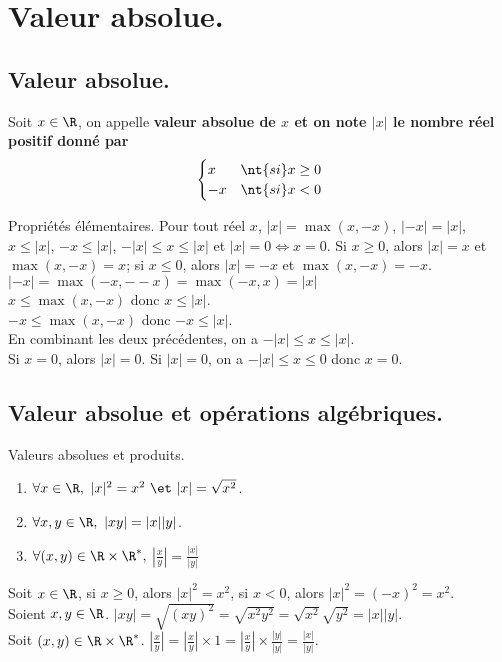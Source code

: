 \documentclass[11pt]{article}
\begin{document}
\section{Valeur absolue.}

\subsection{Valeur absolue.}

\begin{defi}{}{}
    Soit $x\in\R$, on appelle \bf{valeur absolue} de $x$ et on note $|x|$ le nombre réel positif donné par
    \begin{equation*}
        \begin{cases}
            x&\nt{si }x\geq0\\
            -x&\nt{si }x<0
        \end{cases}
    \end{equation*}
\end{defi}

\begin{prop}{Propriétés élémentaires.}{}
    Pour tout réel $x$, $|x|=\max(x,-x)$, $|-x|=|x|$, $x\leq|x|$, $-x\leq|x|$, $-|x|\leq x\leq |x|$ et $|x|=0\iff x=0$.
    \tcblower
     Si $x\geq0$, alors $|x|=x$ et $\max(x,-x)=x$; si $x\leq0$, alors $|x|=-x$ et $\max(x,-x)=-x$.\\
     $|-x|=\max(-x,--x)=\max(-x,x)=|x|$ \\
     $x\leq\max(x,-x)$ donc $x\leq |x|$.\\
     $-x\leq\max(x,-x)$ donc $-x\leq|x|$.\\
     En combinant les deux précédentes, on a $-|x|\leq x\leq |x|$.\\
     Si $x=0$, alors $|x|=0$. Si $|x|=0$, on a $-|x|\leq x\leq 0$ donc $x=0$.
\end{prop}

\subsection{Valeur absolue et opérations algébriques.}

\begin{prop}{Valeurs absolues et produits.}{}
    \begin{enumerate}
        \item $\forall x\in\R,~|x|^2=x^2~\et~|x|=\sqrt{x^2}$.
        \item $\forall x,y \in \R,~|xy|=|x||y|$.
        \item $\forall (x,y)\in\R\times\R^*,~$\Large$\left|\frac{x}{y}\right|=\frac{|x|}{|y|}$
    \end{enumerate}
    \tcblower
     Soit $x\in\R$, si $x\geq0$, alors $|x|^2=x^2$, si $x<0$, alors $|x|^2=(-x)^2=x^2$.\\
     Soient $x,y\in\R$. $|xy|=\sqrt{(xy)^2}=\sqrt{x^2y^2}=\sqrt{x^2}\sqrt{y^2}=|x||y|$.\\
     Soit $(x,y)\in\R\times\R^*$. $\left|\frac{x}{y}\right|=\left|\frac{x}{y}\right|\times1=\left|\frac{x}{y}\right|\times\frac{|y|}{|y|}=\frac{|x|}{|y|}$.
\end{prop}
\end{document}
